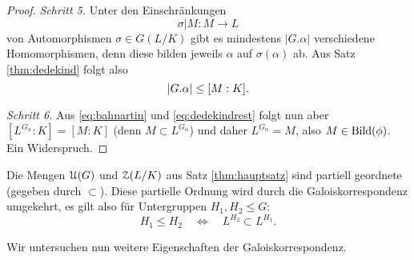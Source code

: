 \documentclass{book}
\begin{document}
\begin{proof}
    \noindent
    \emph{Schritt 5.} Unter den Einschränkungen 
    \[
        \sigma|M : M \to L
    \]
    von Automorphismen $\sigma \in G(L/K)$ gibt es mindestens $|G.\alpha|$
    verschiedene Homomorphismen, denn diese bilden jeweils $\alpha$ auf
    $\sigma(\alpha)$ ab. Aus Satz \ref{thm:dedekind} folgt also
    \begin{equation}
        \label{eq:dedekindrest}
        |G.\alpha| \le [M:K].\\[1ex]
    \end{equation}

    \noindent
    \emph{Schritt 6.} Aus \eqref{eq:bahnartin} und \eqref{eq:dedekindrest}
    folgt nun aber $[L^{G_{\alpha}}:K] = [M:K]$ (denn $M \subset
    L^{G_{\alpha}}$) und daher $L^{G_{\alpha}} = M$, also $M \in \Bild(\phi)$. Ein Widerspruch.
\end{proof}

\begin{rem}
    \label{rem:galoisordnung}
    Die Mengen $\EuScript{U}(G)$ und $\EuScript{Z}(L/K)$ aus Satz \ref{thm:hauptsatz} sind
    partiell geordnete (gegeben durch $\subset$). Diese partielle Ordnung wird
    durch die Galoiskorrespondenz umgekehrt, es gilt also für Untergruppen
    $H_1,H_2 \le
    G$:
    \[
        H_1 \le H_2 \quad \iff \quad L^{H_2} \subset L^{H_1}.
    \]
\end{rem}

Wir untersuchen nun weitere Eigenschaften der Galoiskorrespondenz. 
\end{document}

